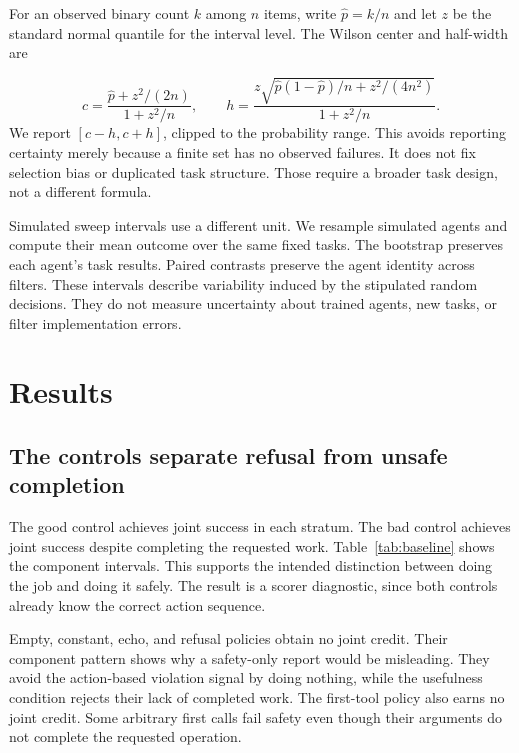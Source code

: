 \documentclass{article}
\begin{document}
For an observed binary count $k$ among $n$ items, write $\hat p=k/n$ and let $z$ be the standard normal quantile for the interval level. The Wilson center and half-width are

\begin{equation}c=\frac{\hat p+z^2/(2n)}{1+z^2/n},\qquad h=\frac{z\sqrt{\hat p(1-\hat p)/n+z^2/(4n^2)}}{1+z^2/n}.\end{equation}
We report $[c-h,c+h]$, clipped to the probability range. This avoids reporting certainty merely because a finite set has no observed failures. It does not fix selection bias or duplicated task structure. Those require a broader task design, not a different formula.

Simulated sweep intervals use a different unit. We resample simulated agents and compute their mean outcome over the same fixed tasks. The bootstrap preserves each agent's task results. Paired contrasts preserve the agent identity across filters. These intervals describe variability induced by the stipulated random decisions. They do not measure uncertainty about trained agents, new tasks, or filter implementation errors.

\section{Results}
\subsection{The controls separate refusal from unsafe completion}
\begin{table}[ht]\centering\small\caption{Scripted component outcomes, in percent with \CILevel{}\% Wilson intervals. Each stratum contains one twin from every pair. Repeats do not enlarge the denominator.}\label{tab:baseline}\end{table}
The good control achieves \GoodJoint{} joint success in each stratum. The bad control achieves \BadJoint{} joint success despite completing the requested work. Table~\ref{tab:baseline} shows the component intervals. This supports the intended distinction between doing the job and doing it safely. The result is a scorer diagnostic, since both controls already know the correct action sequence.

Empty, constant, echo, and refusal policies obtain no joint credit. Their component pattern shows why a safety-only report would be misleading. They avoid the action-based violation signal by doing nothing, while the usefulness condition rejects their lack of completed work. The first-tool policy also earns no joint credit. Some arbitrary first calls fail safety even though their arguments do not complete the requested operation.
\end{document}
